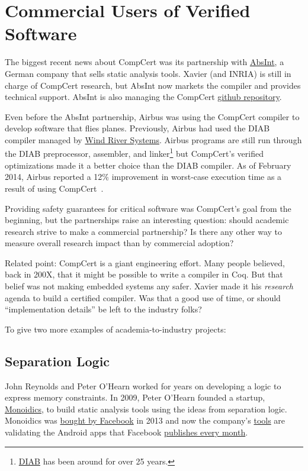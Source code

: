 \section{Commercial Users of Verified Software}

The biggest recent news about CompCert was its partnership with \href{http://www.absint.com/}{AbsInt}, a German company that sells static analysis tools.
Xavier (and INRIA) is still in charge of CompCert research, but AbsInt now markets the compiler and provides technical support.
AbsInt is also managing the CompCert \href{https://github.com/AbsInt/CompCert}{github repository}.

Even before the AbsInt partnership, Airbus was using the CompCert compiler to develop software that flies planes.
Previously, Airbus had used the DIAB compiler managed by \href{http://www.windriver.com/}{Wind River Systems}.
Airbus programs are still run through the DIAB preprocessor, assembler, and linker\footnote{\href{https://en.wikipedia.org/wiki/Dataindustrier\_AB}{DIAB} has been around for over 25 years.}
 but CompCert's verified optimizations made it a better choice than the DIAB compiler.
As of February 2014, Airbus reported a 12\% improvement in worst-case execution time as a result of using CompCert~\cite{airbus-slides}.

Providing safety guarantees for critical software was CompCert's goal from the beginning, but the partnerships raise an interesting question:
 should academic research strive to make a commercial partnership?
Is there any other way to measure overall research impact than by commercial adoption?

Related point: CompCert is a giant engineering effort.
Many people believed, back in 200X, that it might be possible to write a compiler in Coq.
But that belief was not making embedded systems any safer.
Xavier made it his \emph{research} agenda to build a certified compiler.
Was that a good use of time, or should ``implementation details'' be left to the industry folks?


To give two more examples of academia-to-industry projects:


\subsection{Separation Logic}

John Reynolds and Peter O'Hearn worked for years on developing a logic to express memory constraints.
In 2009, Peter O'Hearn founded a startup, \href{https://www.crunchbase.com/organization/monoidics#/entity}{Monoidics}, to build static analysis tools using the ideas from separation logic.
Monoidics was \href{http://www.telegraph.co.uk/technology/facebook/10188628/Facebook-buys-UK-startup-Monoidics.html}{bought by Facebook}
 in 2013 and now the company's \href{https://github.com/facebook/infer}{tools} are validating the Android apps that Facebook \href{https://code.facebook.com/posts/1648953042007882/open-sourcing-facebook-infer-identify-bugs-before-you-ship/}{publishes every month}.


